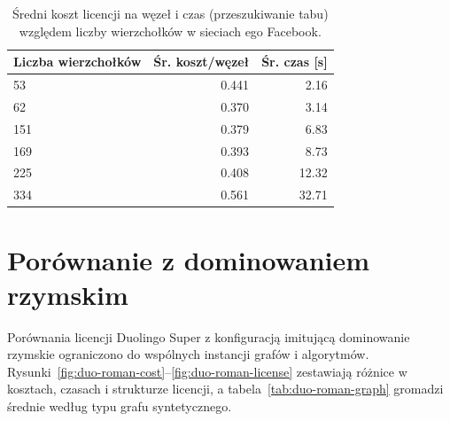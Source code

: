 \begin{table}[H]
  \centering
  \caption{Średni koszt licencji na węzeł i czas (przeszukiwanie tabu) względem liczby wierzchołków w sieciach ego Facebook.}
  \label{tab:duo-real-size-table}
  \begin{tabular}{lrr}
    \toprule
    \textbf{Liczba wierzchołków} & \textbf{Śr. koszt/węzeł} & \textbf{Śr. czas [s]} \\
    \midrule
    53                           & 0.441                    & 2.16                  \\
    62                           & 0.370                    & 3.14                  \\
    151                          & 0.379                    & 6.83                  \\
    169                          & 0.393                    & 8.73                  \\
    225                          & 0.408                    & 12.32                 \\
    334                          & 0.561                    & 32.71                 \\
    \bottomrule
  \end{tabular}
\end{table}


\section{Porównanie z dominowaniem rzymskim}

Porównania licencji Duolingo Super z konfiguracją imitującą dominowanie rzymskie ograniczono do wspólnych instancji grafów i algorytmów. Rysunki~\ref{fig:duo-roman-cost}--\ref{fig:duo-roman-license} zestawiają różnice w kosztach, czasach i strukturze licencji, a tabela~\ref{tab:duo-roman-graph} gromadzi średnie według typu grafu syntetycznego.

